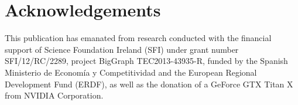 \documentclass{sig-arxiv}
\begin{document}
\section*{Acknowledgements}
This publication has emanated from research conducted with the financial support of Science Foundation Ireland (SFI) under grant number SFI/12/RC/2289, project BigGraph TEC2013-43935-R, funded by the Spanish Ministerio de Econom\'ia y Competitividad and the European Regional Development Fund (ERDF), as well as the donation of a GeForce GTX Titan X from NVIDIA Corporation.


{


}
\end{document}
